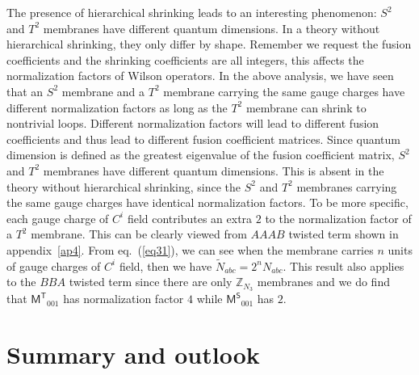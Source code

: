\documentclass[11pt,nofootinbib,preprint]{revtex4-1}
\begin{document}
The presence of hierarchical shrinking leads to an interesting phenomenon: $S^2$ and $T^2$ membranes have different quantum dimensions. In a theory without hierarchical shrinking, they only differ by shape. Remember we request the fusion coefficients and the shrinking coefficients are all integers, this affects the normalization factors of Wilson operators. In the above analysis, we have seen that an $S^2$ membrane and a $T^2$ membrane carrying the same gauge charges have different normalization factors as long as the $T^2$ membrane can shrink to nontrivial loops. Different normalization factors will lead to different fusion coefficients and thus lead to different fusion coefficient matrices. Since quantum dimension is defined as the greatest eigenvalue of the fusion coefficient matrix,  $S^2$ and $T^2$ membranes have different quantum dimensions. This is absent in the theory without hierarchical shrinking, since the $S^2$ and $T^2$ membranes carrying the same gauge charges have identical normalization factors. To be more specific, each gauge charge of $C^i$ field contributes an extra $2$ to the normalization factor of a $T^2$ membrane. This can be clearly viewed from $AAAB$ twisted term shown in appendix~\ref{ap4}. From eq.~(\ref{eq31}), we can see when the membrane carries $n$ units of gauge charges of $C^i$ field, then we have $\tilde{N}_{abc}=2^nN_{abc}$. This result also applies to the $BBA$ twisted term since there are only $\mathbb{Z}_{N_3}$ membranes and we do find that $\mathsf{M^T}_{001}$ has normalization factor $4$ while $\mathsf{M^S}_{001}$ has $2$. 



\section{Summary and outlook}\label{section_summary}
\end{document}
